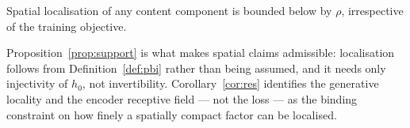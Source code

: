 \begin{corollary}
\label{cor:res}
Spatial localisation of any content component is bounded below by $\rho$, irrespective of the
training objective.
\end{corollary}

Proposition~\ref{prop:support} is what makes spatial claims admissible: localisation follows
from Definition~\ref{def:pbi} rather than being assumed, and it needs only injectivity of
$h_0$, not invertibility. Corollary~\ref{cor:res} identifies the generative locality and the
encoder receptive field --- not the loss --- as the binding constraint on how finely a
spatially compact factor can be localised.
